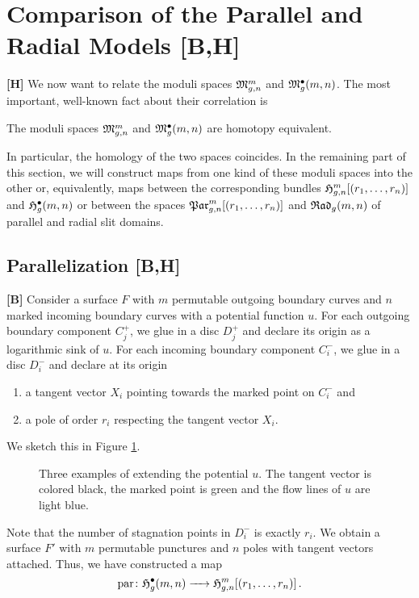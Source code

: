 \section{Comparison of the Parallel and Radial Models [B,H]}

{\bf [H]} We now want to relate the moduli spaces $\mathfrak{M}^m_{g,n}$ and $\mathfrak{M}^\bullet_g(m, n)$.
The most important, well-known fact about their correlation is

\begin{prop}
    \label{cellular_models:comparision_of_the_models:bundles_are_h_equiv}
    The moduli spaces $\mathfrak{M}^m_{g,n}$ and $\mathfrak{M}^\bullet_g(m, n)$ are homotopy equivalent.
\end{prop}

In particular, the homology of the two spaces coincides.
In the remaining part of this section, we will construct maps from one kind of these moduli spaces into the other
or, equivalently, maps between the corresponding bundles $\mathfrak{H}^m_{g,n}[(r_1, \dotsc, r_n)]$ and $\mathfrak{H}^{\bullet}_g(m, n)$ or between the spaces $\mathfrak{Par}_{g, n}^m[(r_1, \dotsc, r_n)]$ and ${\mathfrak{Rad}_g(m,n)}$ of parallel and radial slit domains.

\subsection{Parallelization [B,H]}
\label{cellular_parallelization}

{\bf [B]} Consider a surface $F$ with $m$ permutable outgoing boundary curves and $n$ marked incoming boundary curves with a potential function $u$.
For each outgoing boundary component $C^+_j$, we glue in a disc $D^+_j$ and declare its origin as a logarithmic sink of $u$.
For each incoming boundary component $C^-_i$, we glue in a disc $D^-_i$ and declare at its origin
\begin{enumerate}
    \item a tangent vector $X_i$ pointing towards the marked point on $C^-_i$ and
    \item a pole of order $r_i$ respecting the tangent vector $X_i$.
\end{enumerate}
We sketch this in Figure \ref{cellular_models:comparision_of_the_models:glueing_caps}.
\begin{figure}[ht]
    \centering
    \def\svgwidth{\columnwidth}
    
    \caption{\label{cellular_models:comparision_of_the_models:glueing_caps}{Three examples of extending the potential $u$.
        The tangent vector is colored black, the marked point is green and the flow lines of $u$ are light blue.}}
\end{figure}
Note that the number of stagnation points in $D^-_i$ is exactly $r_i$.
We obtain a surface $F'$ with $m$ permutable punctures and $n$ poles with tangent vectors attached.
Thus, we have constructed a map
\[
 \parmap \colon \HarmRad \to \Harmr\,.
\]

